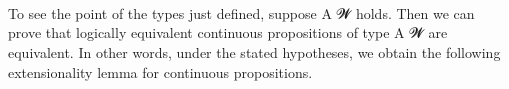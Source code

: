 \begin{code}
\AgdaSpace{}%
\AgdaSpace{}%
\AgdaSymbol{)}\AgdaSpace{}%
\AgdaFunction{,}\AgdaSpace{}%
\AgdaSpace{}%
\AgdaSpace{}%
\AgdaSpace{}%
\AgdaSpace{}%
\AgdaSymbol{(}\AgdaSpace{}%
\AgdaSymbol{)}\<%
\\
%
\\[\AgdaEmptyExtraSkip]%
%
\>[1]\AgdaSpace{}%
\AgdaSymbol{:}\AgdaSpace{}%
\AgdaSpace{}%
\AgdaSpace{}%
\AgdaSpace{}%
\AgdaSymbol{(}\AgdaSpace{}%
\AgdaSymbol{:}\AgdaSpace{}%
\AgdaSymbol{)}\AgdaSpace{}%
\AgdaSpace{}%
\AgdaSpace{}%
\AgdaSpace{}%
\<%
\\
%
\>[1]\AgdaSpace{}%
\AgdaSpace{}%
\AgdaSpace{}%
\AgdaSymbol{=}\AgdaSpace{}%
\AgdaSymbol{\{}\AgdaSpace{}%
\AgdaSpace{}%
\AgdaSymbol{:}\AgdaSpace{}%
\AgdaSpace{}%
\AgdaSpace{}%
\AgdaSpace{}%
\AgdaSymbol{\}}\AgdaSpace{}%
\AgdaSpace{}%
\AgdaSpace{}%
\AgdaSpace{}%
\AgdaSpace{}%
\AgdaSpace{}%
\AgdaSpace{}%
\AgdaSpace{}%
\AgdaSpace{}%
\AgdaSpace{}%
\AgdaSpace{}%
\AgdaSpace{}%
\AgdaSpace{}%
\AgdaSpace{}%
\AgdaSpace{}%
\AgdaSpace{}%
\AgdaSpace{}%
\AgdaSpace{}%
\AgdaSpace{}%
\AgdaSpace{}%
\<%
\end{code}
\ccpad
To see the point of the types just defined, suppose  \ab A \ab 𝓦 holds. Then we can prove that logically equivalent continuous propositions of type  \ab A \ab 𝓦 are equivalent. In other words, under the stated hypotheses, we obtain the following  extensionality lemma for continuous propositions.
